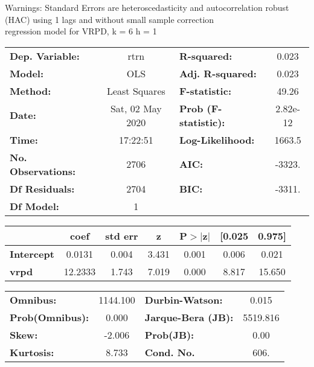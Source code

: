 Warnings: \newline
 [1] Standard Errors are heteroscedasticity and autocorrelation robust (HAC) using 1 lags and without small sample correction\\ 

regression model for VRPD, k = 6 h = 1\begin{center}
\begin{tabular}{lclc}
\toprule
\textbf{Dep. Variable:}    &       rtrn       & \textbf{  R-squared:         } &     0.023   \\
\textbf{Model:}            &       OLS        & \textbf{  Adj. R-squared:    } &     0.023   \\
\textbf{Method:}           &  Least Squares   & \textbf{  F-statistic:       } &     49.26   \\
\textbf{Date:}             & Sat, 02 May 2020 & \textbf{  Prob (F-statistic):} &  2.82e-12   \\
\textbf{Time:}             &     17:22:51     & \textbf{  Log-Likelihood:    } &    1663.5   \\
\textbf{No. Observations:} &        2706      & \textbf{  AIC:               } &    -3323.   \\
\textbf{Df Residuals:}     &        2704      & \textbf{  BIC:               } &    -3311.   \\
\textbf{Df Model:}         &           1      & \textbf{                     } &             \\
\bottomrule
\end{tabular}
\begin{tabular}{lcccccc}
                   & \textbf{coef} & \textbf{std err} & \textbf{z} & \textbf{P$> |$z$|$} & \textbf{[0.025} & \textbf{0.975]}  \\
\midrule
\textbf{Intercept} &       0.0131  &        0.004     &     3.431  &         0.001        &        0.006    &        0.021     \\
\textbf{vrpd}      &      12.2333  &        1.743     &     7.019  &         0.000        &        8.817    &       15.650     \\
\bottomrule
\end{tabular}
\begin{tabular}{lclc}
\textbf{Omnibus:}       & 1144.100 & \textbf{  Durbin-Watson:     } &    0.015  \\
\textbf{Prob(Omnibus):} &   0.000  & \textbf{  Jarque-Bera (JB):  } & 5519.816  \\
\textbf{Skew:}          &  -2.006  & \textbf{  Prob(JB):          } &     0.00  \\
\textbf{Kurtosis:}      &   8.733  & \textbf{  Cond. No.          } &     606.  \\
\bottomrule
\end{tabular}
\end{center}

